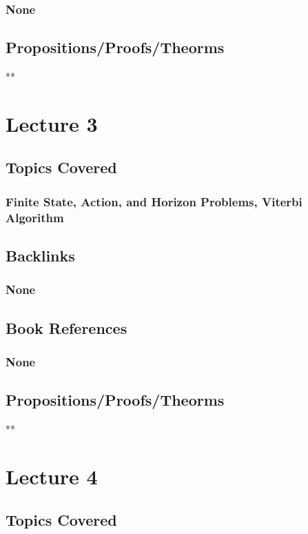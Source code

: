 \documentclass[11pt]{article}
\begin{document}
\subsubsection*{None}
\label{sec:orge32779f}
\subsection*{Propositions/Proofs/Theorms}
\label{sec:org1345ccb}
**

\section*{Lecture 3}
\label{sec:org863adcf}
\subsection*{Topics Covered}
\label{sec:orgb4668a2}
\subsubsection*{Finite State, Action, and Horizon Problems, Viterbi Algorithm}
\label{sec:org57ff4ac}
\subsection*{Backlinks}
\label{sec:org7dbad2f}
\subsubsection*{None}
\label{sec:org4367686}
\subsection*{Book References}
\label{sec:org025491f}
\subsubsection*{None}
\label{sec:orgeb52062}
\subsection*{Propositions/Proofs/Theorms}
\label{sec:orga35b673}
**

\section*{Lecture 4}
\label{sec:org909c2ac}
\subsection*{Topics Covered}
\label{sec:org50a93c6}
\end{document}
